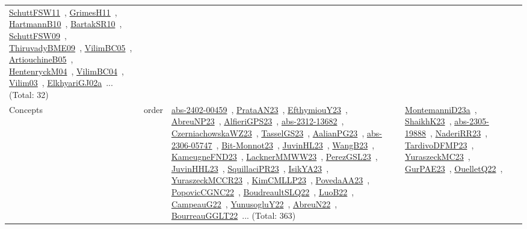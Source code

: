 {\begin{longtable}{lp{3cm}>{\raggedright\arraybackslash}p{6cm}>{\raggedright\arraybackslash}p{6cm}>{\raggedright\arraybackslash}p{8cm}}
\href{works/SchuttFSW11.pdf}{SchuttFSW11}~\cite{SchuttFSW11}, \href{works/GrimesH11.pdf}{GrimesH11}~\cite{GrimesH11}, \href{works/HartmannB10.pdf}{HartmannB10}~\cite{HartmannB10}, \href{works/BartakSR10.pdf}{BartakSR10}~\cite{BartakSR10}, \href{works/SchuttFSW09.pdf}{SchuttFSW09}~\cite{SchuttFSW09}, \href{works/ThiruvadyBME09.pdf}{ThiruvadyBME09}~\cite{ThiruvadyBME09}, \href{works/VilimBC05.pdf}{VilimBC05}~\cite{VilimBC05}, \href{works/ArtiouchineB05.pdf}{ArtiouchineB05}~\cite{ArtiouchineB05}, \href{works/HentenryckM04.pdf}{HentenryckM04}~\cite{HentenryckM04}, \href{works/VilimBC04.pdf}{VilimBC04}~\cite{VilimBC04}, \href{works/Vilim03.pdf}{Vilim03}~\cite{Vilim03}, \href{works/ElkhyariGJ02a.pdf}{ElkhyariGJ02a}~\cite{ElkhyariGJ02a}... (Total: 32)\\
Concepts & order & \href{works/abs-2402-00459.pdf}{abs-2402-00459}~\cite{abs-2402-00459}, \href{works/PrataAN23.pdf}{PrataAN23}~\cite{PrataAN23}, \href{works/EfthymiouY23.pdf}{EfthymiouY23}~\cite{EfthymiouY23}, \href{works/AbreuNP23.pdf}{AbreuNP23}~\cite{AbreuNP23}, \href{works/AlfieriGPS23.pdf}{AlfieriGPS23}~\cite{AlfieriGPS23}, \href{works/abs-2312-13682.pdf}{abs-2312-13682}~\cite{abs-2312-13682}, \href{works/CzerniachowskaWZ23.pdf}{CzerniachowskaWZ23}~\cite{CzerniachowskaWZ23}, \href{works/TasselGS23.pdf}{TasselGS23}~\cite{TasselGS23}, \href{works/AalianPG23.pdf}{AalianPG23}~\cite{AalianPG23}, \href{works/abs-2306-05747.pdf}{abs-2306-05747}~\cite{abs-2306-05747}, \href{works/Bit-Monnot23.pdf}{Bit-Monnot23}~\cite{Bit-Monnot23}, \href{works/JuvinHL23.pdf}{JuvinHL23}~\cite{JuvinHL23}, \href{works/WangB23.pdf}{WangB23}~\cite{WangB23}, \href{works/KameugneFND23.pdf}{KameugneFND23}~\cite{KameugneFND23}, \href{works/LacknerMMWW23.pdf}{LacknerMMWW23}~\cite{LacknerMMWW23}, \href{works/PerezGSL23.pdf}{PerezGSL23}~\cite{PerezGSL23}, \href{works/JuvinHHL23.pdf}{JuvinHHL23}~\cite{JuvinHHL23}, \href{works/SquillaciPR23.pdf}{SquillaciPR23}~\cite{SquillaciPR23}, \href{works/IsikYA23.pdf}{IsikYA23}~\cite{IsikYA23}, \href{works/YuraszeckMCCR23.pdf}{YuraszeckMCCR23}~\cite{YuraszeckMCCR23}, \href{works/KimCMLLP23.pdf}{KimCMLLP23}~\cite{KimCMLLP23}, \href{works/PovedaAA23.pdf}{PovedaAA23}~\cite{PovedaAA23}, \href{works/PopovicCGNC22.pdf}{PopovicCGNC22}~\cite{PopovicCGNC22}, \href{works/BoudreaultSLQ22.pdf}{BoudreaultSLQ22}~\cite{BoudreaultSLQ22}, \href{works/LuoB22.pdf}{LuoB22}~\cite{LuoB22}, \href{works/CampeauG22.pdf}{CampeauG22}~\cite{CampeauG22}, \href{works/YunusogluY22.pdf}{YunusogluY22}~\cite{YunusogluY22}, \href{works/AbreuN22.pdf}{AbreuN22}~\cite{AbreuN22}, \href{works/BourreauGGLT22.pdf}{BourreauGGLT22}~\cite{BourreauGGLT22}... (Total: 363) & \href{works/MontemanniD23a.pdf}{MontemanniD23a}~\cite{MontemanniD23a}, \href{works/ShaikhK23.pdf}{ShaikhK23}~\cite{ShaikhK23}, \href{works/abs-2305-19888.pdf}{abs-2305-19888}~\cite{abs-2305-19888}, \href{works/NaderiRR23.pdf}{NaderiRR23}~\cite{NaderiRR23}, \href{works/TardivoDFMP23.pdf}{TardivoDFMP23}~\cite{TardivoDFMP23}, \href{works/YuraszeckMC23.pdf}{YuraszeckMC23}~\cite{YuraszeckMC23}, \href{works/GurPAE23.pdf}{GurPAE23}~\cite{GurPAE23}, \href{works/OuelletQ22.pdf}{OuelletQ22}~\cite{OuelletQ22}, 
\end{longtable}}
